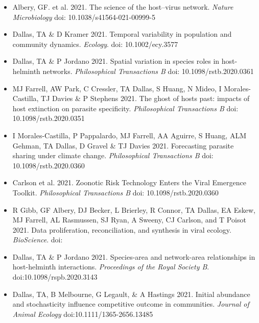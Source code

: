 \documentclass[]{CV}
\begin{document}
\begin{itemize}

\item Albery, GF. et al. 2021. The science of the host–virus network. \textit{Nature Microbiology} doi: 10.1038/s41564-021-00999-5

\item {\mefont Dallas, TA} \& D Kramer 2021. Temporal variability in population and community dynamics. \textit{Ecology}. doi: 10.1002/ecy.3577

\item {\mefont Dallas, TA} \& P Jordano 2021. Spatial variation in species roles in host-helminth networks. \textit{Philosophical Transactions B} doi: 10.1098/rstb.2020.0361

\item MJ Farrell, AW Park, C Cressler, {\mefont TA Dallas}, S Huang, N Mideo, I Morales-Castilla, TJ Davies \& P Stephens 2021. The ghost of hosts past: impacts of host extinction on parasite specificity. \textit{Philosophical Transactions B} doi: 10.1098/rstb.2020.0351

\item I Morales-Castilla, P Pappalardo, MJ Farrell, AA Aguirre, S Huang, ALM Gehman, {\mefont TA Dallas}, D Gravel \& TJ Davies 2021. Forecasting parasite sharing under climate change. \textit{Philosophical Transactions B} doi: 10.1098/rstb.2020.0360

\item Carlson et al. 2021. Zoonotic Risk Technology Enters the Viral Emergence Toolkit. \textit{Philosophical Transactions B} doi: 10.1098/rstb.2020.0360

\item R Gibb, GF Albery, DJ Becker, L Brierley, R Connor, {\mefont TA Dallas}, EA Eskew, MJ Farrell, AL Rasmussen, SJ Ryan, A Sweeny, CJ Carlson, and T Poisot 2021. Data proliferation, reconciliation, and synthesis in viral ecology. \textit{BioScience}. doi: 

\item {\mefont Dallas, TA} \& P Jordano 2021. Species-area and network-area relationships in host-helminth interactions. \textit{Proceedings of the Royal Society B}. doi:10.1098/rspb.2020.3143

\item {\mefont Dallas, TA}, B Melbourne, G Legault, \& A Hastings 2021. Initial abundance and stochasticity influence competitive outcome in communities. \textit{Journal of Animal Ecology} doi:10.1111/1365-2656.13485


\end{itemize}
\end{document}
